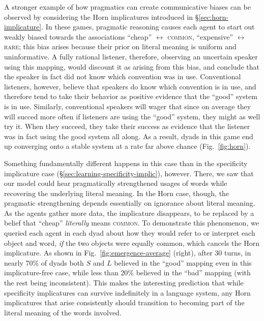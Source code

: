 \documentclass{article} %
\begin{document}
A stronger example of how pragmatics can create communicative biases can be
observed by considering the Horn implicatures introduced in \S\ref{sec:horn-implicature}. 
In these games, pragmatic reasoning causes each agent to start out
weakly biased towards the associations ``cheap'' $\leftrightarrow$
\textsc{common}, ``expensive'' $\leftrightarrow$ \textsc{rare}; this bias arises because their prior on literal meaning
is uniform and uninformative. A fully rational listener, therefore,
observing an uncertain speaker using this mapping, would discount it
as arising from this bias, and conclude that the speaker in fact did
not know which convention was in use. Conventional listeners,
however, believe that speakers do know which convention is in
use, and therefore tend to take their behavior as positive evidence that the
``good'' system is in use. Similarly, conventional speakers
will wager that since on average they will succed more often if
listeners are using the ``good'' system, they might as well try
it. When they succeed, they take their success as evidence that the listener was in
fact using the good system all along. As a result, dyads in this game
 end up converging onto a stable system at a rate far above
chance (Fig.~\ref{fig:horn}). 

Something
fundamentally different happens in this case than in the specificity
implicature case (\S\ref{sec:learning-specificity-implic}), however. There, we
saw that our model could hear pragmatically strengthened usages
of words while recovering the underlying literal meaning. In the Horn
case, though, the pragmatic strengthening depends essentially on
ignorance about literal meaning. As the agents gather more data,
the implicature disappears, to be replaced by a belief that
``cheap'' \textit{literally} means \textsc{common}. To demonstrate
this phenomenon, we queried each agent in each dyad about how they would refer to
or interpret each object and word, \textit{if} the two objects were
equally common, which cancels the Horn implicature. As shown in
Fig.~\ref{fig:emergence-average} (right), after 30 turns, in nearly 70\%
of dyads both $S$ and $L$ believed in the ``good'' mapping even in
this implicature-free case, while less than 20\% believed in the
``bad'' mapping (with the rest being inconsistent). This makes the
interesting prediction that while specificity implicatures can survive
indefinitely in a language system, any Horn implicatures that arise
consistently should transition to becoming part of the literal meaning
of the words involved.
\end{document}
